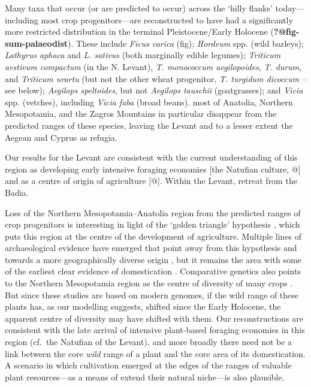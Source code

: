 \documentclass[
  authoryear,
  preprint]{elsarticle}
\begin{document}
Many taxa that occur (or are predicted to occur) across the `hilly
flanks' today---including most crop progenitors---are reconstructed to
have had a significantly more restricted distribution in the terminal
Pleistocene/Early Holocene (\textbf{?@fig-sum-palaeodist}). These
include \emph{Ficus carica} (fig); \emph{Hordeum} spp. (wild barleys);
\emph{Lathyrus aphaca} and \emph{L. sativus} (both marginally edible
legumes); \emph{Triticum aestivum compactum} (in the N. Levant),
\emph{T. monococcum aegilopoides}, \emph{T. durum}, and \emph{Triticum
urartu} (but not the other wheat progenitor, \emph{T. turgidum dicoccum}
-- see below); \emph{Aegilops speltoides}, but not \emph{Aegilops
tauschii} (goatgrasses); and \emph{Vicia} spp. (vetches), including
\emph{Vicia faba} (broad beans). most of Anatolia, Northern Mesopotamia,
and the Zagros Mountains in particular disappear from the predicted
ranges of these species, leaving the Levant and to a lesser extent the
Aegean and Cyprus as refugia.

Our results for the Levant are consistent with the current understanding
of this region as developing early intensive foraging economies {[}the
Natufian culture, @{]} and as a centre of origin of agriculture {[}@{]}.
Within the Levant, retreat from the Badia.

Loss of the Northern Mesopotamia--Anatolia region from the predicted
ranges of crop progenitors is interesting in light of the `golden
triangle' hypothesis
\citep{Lev-YadunEtAl2000, KozlowskiAurenche2005, AbboEtAl2010}, which
puts this region at the centre of the development of agriculture.
Multiple lines of archaeological evidence have emerged that point away
from this hypothesis and towards a more geographically diverse origin
\citep{Asouti2006, cites}, but it remains the area with some of the
earliest clear evidence of domestication
\citep{ZoharyHopfWeiss2012, KabukcuEtAl2021, UlasEtAl2024}. Comparative
genetics also points to the Northern Mesopotamia region as the centre of
diversity of many crops \citep[e.g.][]{HaasEtAl2019}. But since these
studies are based on modern genomes, if the wild range of these plants
has, as our modelling suggests, shifted since the Early Holocene, the
apparent centre of diversity may have shifted with them. Our
reconstructions are consistent with the late arrival of intensive
plant-based foraging economies in this region (cf.~the Natufian of the
Levant), and more broadly there need not be a link between the core
\emph{wild} range of a plant and the core area of its domestication. A
scenario in which cultivation emerged at the edges of the ranges of
valuable plant resources---as a means of extend their natural niche---is
also plausible.
\end{document}
